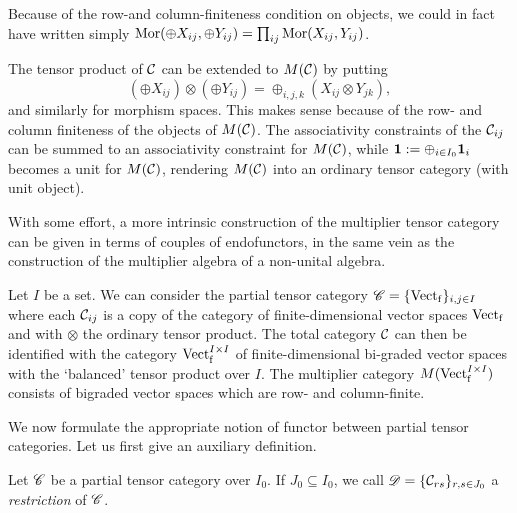 \begin{Rem} Because of the row-and column-finiteness condition on objects, we could in fact have written simply $\mathrm{Mor}(\oplus X_{ij},\oplus Y_{ij}) = \prod_{ij} \mathrm{Mor}(X_{ij},Y_{ij})$. 
\end{Rem} 

The tensor product of $\mathcal{C}$ can be extended to $M(\mathcal{C})$ by putting \[\left(\oplus X_{ij}\right)\otimes \left(\oplus Y_{ij}\right) = \oplus_{i,j,k} \left(X_{ij}\otimes Y_{jk}\right),\] and similarly for morphism spaces. This makes sense because of the row- and column finiteness of the objects of $M(\mathcal{C})$. The associativity constraints of the $\mathcal{C}_{ij}$ can be summed to an associativity constraint for $M(\mathcal{C})$, while $\mathbf{1} := \oplus_{i\in I_0} \mathbf{1}_i$ becomes a unit for $M(\mathcal{C})$, rendering $M(\mathcal{C})$ into an ordinary tensor category (with unit object).

\begin{Rem} With some effort, a more intrinsic construction of the multiplier tensor category can be given in terms of couples of endofunctors, in the same vein as the construction of the multiplier algebra of a non-unital algebra.
\end{Rem} 

\begin{Exa}\label{ExaVectBiGr} Let $I$ be a set. We can consider the partial tensor category $\mathscr{C} = \{\mathrm{Vect}_{\operatorname{\mathrm{f}}}\}_{i,j\in I}$ where each $\mathcal{C}_{ij}$ is a copy of the category of finite-dimensional vector spaces $\mathrm{Vect}_{\operatorname{\mathrm{f}}}$ and with $\otimes$ the ordinary tensor product. The total category $\mathcal{C}$ can then be identified with the category $\mathrm{Vect}^{I\times I}_{\operatorname{\mathrm{f}}}$ of finite-dimensional bi-graded vector spaces with the `balanced' tensor product over $I$. The multiplier category $M(\mathrm{Vect}^{I\times I}_{\operatorname{\mathrm{f}}})$ consists of bigraded vector spaces which are row- and column-finite.
\end{Exa}

We now formulate the appropriate notion of functor between partial tensor categories. Let us first give an auxiliary definition.

\begin{Def} Let $\mathscr{C}$ be a partial tensor category over $I_0$. If $J_0\subseteq I_0$, we call $\mathscr{D} = \{\mathcal{C}_{rs}\}_{r,s\in J_0}$ a \emph{restriction} of $\mathscr{C}$. 
\end{Def} 

